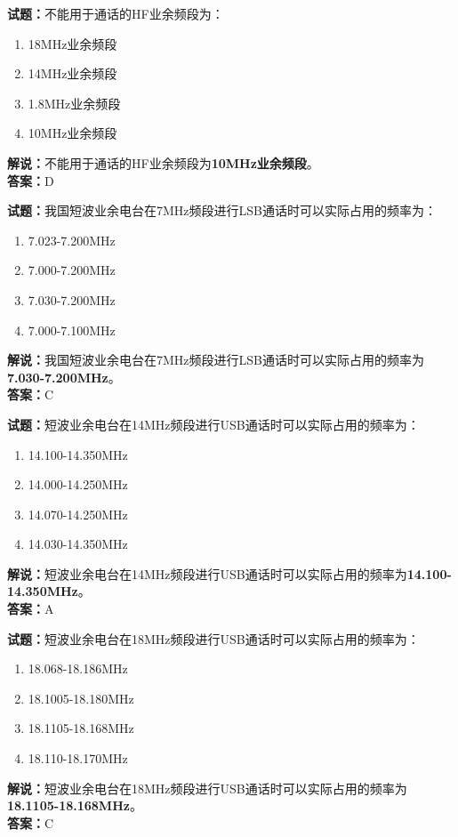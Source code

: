 \documentclass{ctexbook}
\begin{document}
\vspace{\baselineskip}

\noindent\textbf{试题：}不能用于通话的HF业余频段为：
\begin{enumerate}[leftmargin=3em]
  \item 18\unit{\MHz}业余频段
  \item 14\unit{\MHz}业余频段
  \item 1.8\unit{\MHz}业余频段
  \item 10\unit{\MHz}业余频段
\end{enumerate}
\noindent\textbf{解说：}不能用于通话的HF业余频段为\textbf{10\unit{\MHz}业余频段}。\\\noindent\textbf{答案：}D

\vspace{\baselineskip}

\noindent\textbf{试题：}我国短波业余电台在7\unit{\MHz}频段进行LSB通话时可以实际占用的频率为：
\begin{enumerate}[leftmargin=3em]
  \item 7.023-7.200\unit{\MHz}
  \item 7.000-7.200\unit{\MHz}
  \item 7.030-7.200\unit{\MHz}
  \item 7.000-7.100\unit{\MHz}
\end{enumerate}
\noindent\textbf{解说：}我国短波业余电台在7\unit{\MHz}频段进行LSB通话时可以实际占用的频率为\textbf{7.030-7.200\unit{\MHz}}。\\\noindent\textbf{答案：}C

\vspace{\baselineskip}

\noindent\textbf{试题：}短波业余电台在14\unit{\MHz}频段进行USB通话时可以实际占用的频率为：
\begin{enumerate}[leftmargin=3em]
  \item 14.100-14.350\unit{\MHz}
  \item 14.000-14.250\unit{\MHz}
  \item 14.070-14.250\unit{\MHz}
  \item 14.030-14.350\unit{\MHz}
\end{enumerate}
\noindent\textbf{解说：}短波业余电台在14\unit{\MHz}频段进行USB通话时可以实际占用的频率为\textbf{14.100-14.350\unit{\MHz}}。\\\noindent\textbf{答案：}A

\vspace{\baselineskip}

\noindent\textbf{试题：}短波业余电台在18\unit{\MHz}频段进行USB通话时可以实际占用的频率为：
\begin{enumerate}[leftmargin=3em]
  \item 18.068-18.186\unit{\MHz}
  \item 18.1005-18.180\unit{\MHz}
  \item 18.1105-18.168\unit{\MHz}
  \item 18.110-18.170\unit{\MHz}
\end{enumerate}
\noindent\textbf{解说：}短波业余电台在18\unit{\MHz}频段进行USB通话时可以实际占用的频率为\textbf{18.1105-18.168\unit{\MHz}}。\\\noindent\textbf{答案：}C
\end{document}
